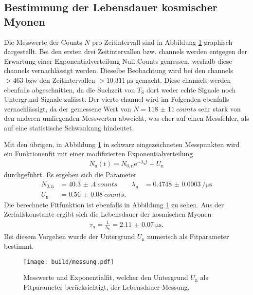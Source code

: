 \subsection{Bestimmung der Lebensdauer kosmischer Myonen}

Die Messwerte der Counts $N$ pro Zeitintervall sind in Abbildung \ref{fig:messung} graphisch dargestellt.
Bei den ersten drei Zeitintervallen bzw. channels werden entgegen der Erwartung einer Exponentialverteilung Null Counts gemessen,
weshalb diese channels vernachlässigt werden. Dieselbe Beobachtung wird bei den channels $>463$ bzw den Zeitintervallen
$>\SI{10.311}{\micro\second}$ gemacht. Diese channels werden ebenfalls abgeschnitten, da die Suchzeit von $T_\text{S}$ dort weder echte Signale
noch Untergrund-Signale zulässt. Der vierte channel wird im Folgenden ebenfalls vernachlässigt, da der gemessene Wert
von $N = \SI{118(11)}{counts}$ sehr stark von den anderen umliegenden Messwerten abweicht, was eher auf einen Messfehler, als auf eine
statistische Schwankung hindeutet.

Mit den übrigen, in Abbildung \ref{fig:messung} in schwarz eingezeichneten Messpunkten wird ein Funktionenfit mit einer modifizierten Exponentialverteilung
\begin{align}
  N_\text{n}(t) = N_{0,\text{n}} \mathrm{e}^{-\lambda_\text{n} t} + U_\text{n}
\end{align}
durchgeführt. Es ergeben sich die Parameter
\begin{align}
  N_{0,\text{n}} &= \SI{40.3(4)}{counts} & \lambda_\text{n} &= \SI{0.4748(3)}{\per\micro\second} \\
  U_\text{n} &= \SI{0.56(8)}{counts}. & &
  \label{eqn:Unum}
\end{align}
Die berechnete Fitfunktion ist ebenfalls in Abbildung \ref{fig:messung} zu sehen.
Aus der Zerfallskonstante ergibt sich die Lebensdauer der kosmischen Myonen
\begin{align}
  \tau_\text{n} = \frac1{\lambda_\text{n}} = \SI{2.11(7)}{\micro\second}.
\end{align}
Bei diesem Vorgehen wurde der Untergrund $U_\text{n}$ numerisch als Fitparameter bestimmt.

\begin{figure}[h]
  \centering
  \texttt{[image: build/messung.pdf]}
  \caption{Messwerte und Exponentialfit, welcher den Untergrund $U_\text{n}$ als Fitparameter berücksichtigt, der Lebensdauer-Messung.}
  \label{fig:messung}
\end{figure}

